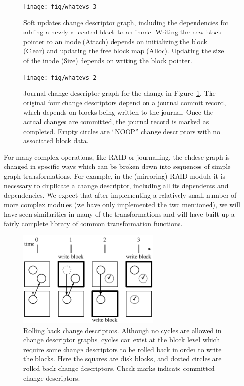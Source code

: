 \begin{figure}[b]
  \centering
  \texttt{[image: fig/whatevs\_3]}%
  \caption{\label{fig:softupdates} Soft updates change descriptor graph,
  including the dependencies for adding a newly allocated block to an
  inode. Writing the new block pointer to an inode (Attach) depends on
  initializing the block (Clear) and updating the free block map (Alloc).
  Updating the size of the inode (Size) depends on writing the block
  pointer.}
\end{figure}

\begin{figure}
  \centering
  \texttt{[image: fig/whatevs\_2]}%
  \caption{\label{fig:journal} Journal change descriptor graph for the
  change in Figure~\ref{fig:softupdates}.  The original four change
  descriptors depend on a journal commit record, which depends on blocks
  being written to the journal.  Once the actual changes are committed, the
  journal record is marked as completed.  Empty circles are ``NOOP'' change
  descriptors with no associated block data.  }
\end{figure}

For many complex operations, like RAID or journalling, the chdesc graph is
changed in specific ways which can be broken down into sequences of simple graph
transformations. For example, in the (mirroring) RAID module it is necessary to
duplicate a change descriptor, including all its dependents and dependencies. We
expect that after implementing a relatively small number of more complex modules
(we have only implemented the two mentioned), we will have seen similarities in
many of the transformations and will have built up a fairly complete library of
common transformation functions.



\begin{figure}
  \centering
  \includegraphics[width=200pt]{rollback_sequence}
  \caption{\label{fig:rollback} Rolling back change descriptors. Although no
  cycles are allowed in change descriptor graphs, cycles can exist at the block
  level which require some change descriptors to be rolled back in order to
  write the blocks. Here the squares are disk blocks, and dotted circles are
  rolled back change descriptors. Check marks indicate committed change
  descriptors.
}
\end{figure}

